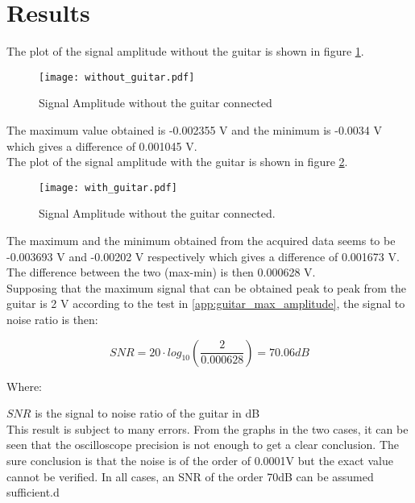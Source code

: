 \section{Results}

The plot of the signal amplitude without the guitar is shown in figure \ref{fig:without_guitar}. \\

\begin{figure}[hbt]
  \centering
  \texttt{[image: without\_guitar.pdf]}
  \caption{Signal Amplitude without the guitar connected}
  \label{fig:without_guitar}
\end{figure}

The maximum value obtained is -0.002355 V and the minimum is -0.0034 V which gives a difference of 0.001045 V. \\

The plot of the signal amplitude with the guitar is shown in figure \ref{fig:with_guitar}. \\

\begin{figure}[hbt]
  \centering
  \texttt{[image: with\_guitar.pdf]}
  \caption{Signal Amplitude without the guitar connected.}
  \label{fig:with_guitar}
\end{figure}

The maximum and the minimum obtained from the acquired data seems to be -0.003693 V and -0.00202 V respectively which gives a difference of 0.001673 V.  \\
The difference between the two (max-min) is then 0.000628 V. \\
Supposing that the maximum signal that can be obtained peak to peak from the guitar is 2 V according to the test in \autoref{app:guitar_max_amplitude}, the signal to noise ratio is then:

\begin{equation}
	SNR = 20 \cdot log_{10}\left(\frac{2}{0.000628}\right) = 70.06dB
	\end{equation}

Where:

$SNR$ is the signal to noise ratio of the guitar in dB \\


This result is subject to many errors. From the graphs in the two cases, it can be seen that the oscilloscope precision is not enough to get a clear conclusion. The sure conclusion is that the noise is of the order of 0.0001V but the exact value cannot be verified. In all cases, an SNR of the order 70dB can be assumed sufficient.d